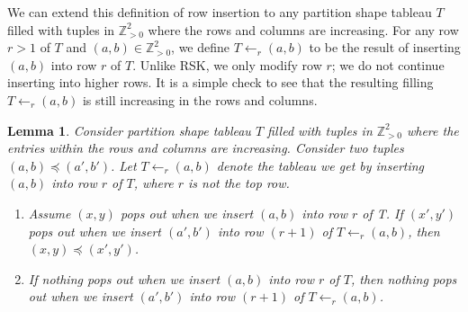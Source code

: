 \documentclass[10pt]{amsart}
\theoremstyle{plain}
\theoremstyle{definition}
\theoremstyle{plain}
\newtheorem{lemma}[lemma]{Lemma}
\theoremstyle{plain}
\theoremstyle{remark}
\theoremstyle{plain}
\theoremstyle{plain}
\begin{document}
We can extend this definition of row insertion to any partition shape tableau $T$ filled with tuples in $\mathbb{Z}^2_{>0}$ where the rows and columns are increasing. For any row $r>1$ of $T$ and $(a,b)\in \mathbb{Z}^2_{>0}$, we define $T\leftarrow_{r} (a,b)$ to be the result of inserting $(a,b)$ into row $r$ of $T$. Unlike RSK, we only modify row $r$; we do not continue inserting into higher rows. It is a simple check to see that the resulting filling $T\leftarrow_{r} (a,b)$ is still increasing in the rows and columns.

\begin{lemma}\label{lemma: inserting larger things higher}
    Consider partition shape tableau $T$ filled with tuples in $\mathbb{Z}^2_{>0}$ where the entries within the rows and columns are increasing. Consider two tuples $(a,b) \preceq (a',b')$.
    Let $T\leftarrow_r (a,b)$ denote the tableau we get by inserting $(a,b)$ into row $r$ of $T$, where $r$ is not the top row. 
    \begin{enumerate}
        \item Assume $(x,y)$ pops out when we insert $(a,b)$ into row $r$ of T. If $(x',y')$ pops out when we insert $(a',b')$ into row $(r+1)$ of $T\leftarrow_r (a,b)$, then $(x,y)\preceq (x',y')$.
        \item If nothing pops out when we insert $(a,b)$ into row $r$ of $T$, then nothing pops out when we insert $(a',b')$ into row $(r+1)$ of $T\leftarrow_r (a,b)$.
        \end{enumerate}
\end{lemma}
\end{document}
